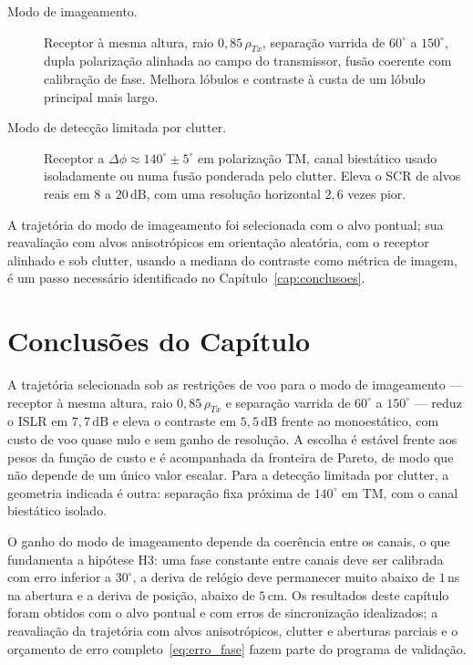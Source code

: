 \documentclass[12pt,a4paper,oneside]{book}
\theoremstyle{remark}
\newcommand{\dB}{\,\mathrm{dB}}
\theoremstyle{plain}
\theoremstyle{definition}
\begin{document}
\begin{description}
  \item[Modo de imageamento.] Receptor à mesma altura, raio $0,85\,\rho_{Tx}$,
  separação varrida de $60^\circ$ a $150^\circ$, dupla polarização alinhada ao campo
  do transmissor, fusão coerente com calibração de fase. Melhora lóbulos e
  contraste à custa de um lóbulo principal mais largo.
  \item[Modo de detecção limitada por clutter.] Receptor a
  $\Delta\phi\approx140^\circ\pm5^\circ$ em polarização TM, canal biestático usado
  isoladamente ou numa fusão ponderada pelo clutter. Eleva o SCR de alvos reais em
  $8$ a $20\dB$, com uma resolução horizontal $2,6$ vezes pior.
\end{description}

A trajetória do modo de imageamento foi selecionada com o alvo pontual; sua
reavaliação com alvos anisotrópicos em orientação aleatória, com o receptor
alinhado e sob clutter, usando a mediana do contraste como métrica de imagem, é
um passo necessário identificado no Capítulo~\ref{cap:conclusoes}.

\section{Conclusões do Capítulo}
\label{sec:traj_concl}

A trajetória selecionada sob as restrições de voo para o modo de imageamento ---
receptor à mesma altura, raio $0,85\,\rho_{Tx}$ e separação varrida de $60^\circ$ a
$150^\circ$ --- reduz o ISLR em $7,7\dB$ e eleva o contraste em $5,5\dB$ frente ao
monoestático, com custo de voo quase nulo e sem ganho de resolução. A escolha é
estável frente aos pesos da função de custo e é acompanhada da fronteira de Pareto,
de modo que não depende de um único valor escalar. Para a detecção limitada por
clutter, a geometria indicada é outra: separação fixa próxima de $140^\circ$ em TM,
com o canal biestático isolado.

O ganho do modo de imageamento depende da coerência entre os canais, o que
fundamenta a hipótese H3: uma fase constante entre canais deve ser calibrada com
erro inferior a $30^\circ$, a deriva de relógio deve permanecer muito abaixo de
$1\,$ns na abertura e a deriva de posição, abaixo de $5\,$cm. Os resultados deste
capítulo foram obtidos com o alvo pontual e com erros de sincronização
idealizados; a reavaliação da trajetória com alvos anisotrópicos, clutter e
aberturas parciais e o orçamento de erro completo~\eqref{eq:erro_fase} fazem parte
do programa de validação.
\end{document}
